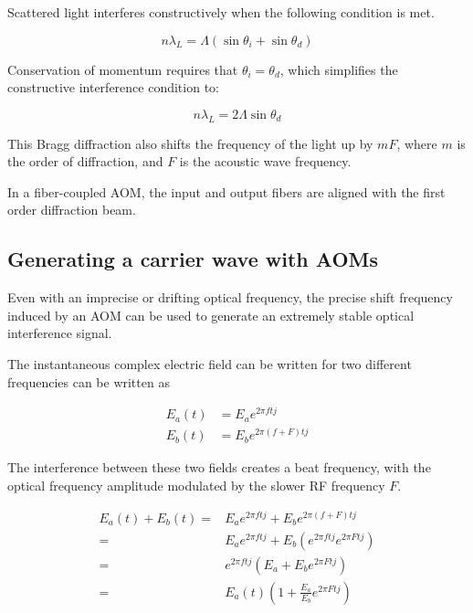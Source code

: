 Scattered light interferes constructively when the following condition is met.

\begin{equation} \label{eq:constructive_interference}
n \lambda_L = \Lambda (\sin{\theta_i} + \sin{\theta_d})
\end{equation}

Conservation of momentum requires that $\theta_i = \theta_d$, which simplifies the constructive interference condition to:

\begin{equation}
n \lambda_L = 2 \Lambda \sin{\theta_d}
\end{equation}


This Bragg diffraction also shifts the frequency of the light up by $mF$, where $m$ is the order of diffraction, and $F$ is the acoustic wave frequency.

In a fiber-coupled AOM, the input and output fibers are aligned with the first order diffraction beam.

\subsection{Generating a carrier wave with AOMs}
\label{sec:aom_carrier}

Even with an imprecise or drifting optical frequency, the precise shift frequency induced by an AOM can be used to generate an extremely stable optical interference signal.

The instantaneous complex electric field can be written for two different frequencies can be written as

\begin{align}
E_a(t) & = E_a e^{2 \pi ft j} \\
E_b(t) & = E_b e^{2 \pi (f + F)t j}
\end{align}

The interference between these two fields creates a beat frequency, with the optical frequency amplitude modulated by the slower RF frequency $F$.

\begin{align}
E_a(t) + E_b(t) = & E_a e^{2 \pi ftj} + E_b e^{2 \pi (f + F)t j} \\
= & E_a e^{2 \pi ft j} + E_b (e^{2 \pi ftj} e^{2 \pi Ftj}) \\
= & e^{2 \pi ftj} (E_a + E_b e^{2 \pi Ftj}) \\
= & E_a(t) (1 + \frac{E_a}{E_b} e^{2 \pi Ftj})
\end{align}

